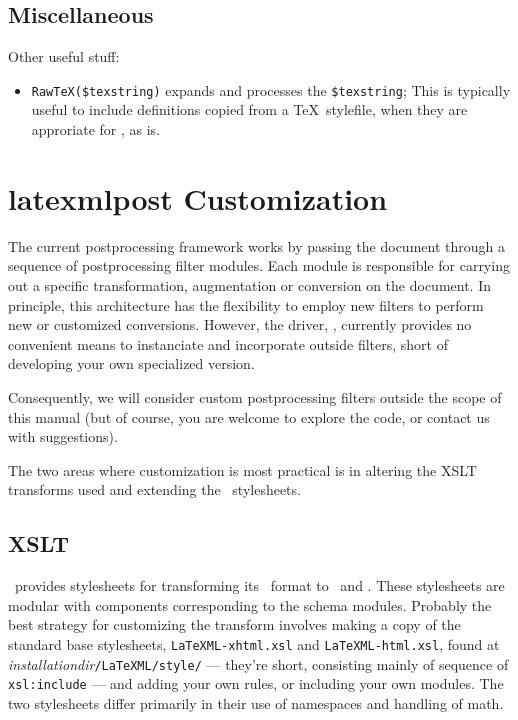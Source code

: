 \documentclass{book}
\begin{document}
\subsection{Miscellaneous}\label{customization.latexml.misc}
Other useful stuff:
\begin{itemize}
\item \verb|RawTeX($texstring)| expands and processes the \verb|$texstring|;
This is typically useful to include definitions copied from a \TeX\ stylefile,
when they are approriate for \LaTeXML, as is.
\end{itemize}


\section{latexmlpost Customization}\label{customization.latexmlpost}
The current postprocessing framework works by passing the document through
a sequence of postprocessing filter modules. Each module is responsible
for carrying out a specific transformation, augmentation or conversion
on the document.   In principle, this architecture has the flexibility to
employ new filters to perform new or customized conversions.
However, the driver, , currently provides no
convenient means to instanciate and incorporate outside filters, short
of developing your own specialized version.

Consequently, we will consider custom postprocessing filters outside
the scope of this manual (but of course, you are welcome to explore
the code, or contact us with suggestions).

The two areas where customization is most practical is in altering
the XSLT transforms used and extending the \CSS\ stylesheets.

\subsection{XSLT}\label{customization.latexmlpost.xslt}
\LaTeXML\ provides stylesheets for transforming its \XML\ format
to \XHTML\ and \HTML. These stylesheets are modular with components
corresponding to the schema modules.  Probably the best strategy
for customizing the transform involves making a copy of the standard
base stylesheets, \texttt{LaTeXML-xhtml.xsl} and
\texttt{LaTeXML-html.xsl},  found at
\textit{installationdir}\texttt{/LaTeXML/style/}
--- they're short, consisting mainly of sequence of  \texttt{xsl:include} ---
and adding your own rules, or including your own modules.
The two stylesheets differ primarily in their use of namespaces
and handling of math.
\end{document}
